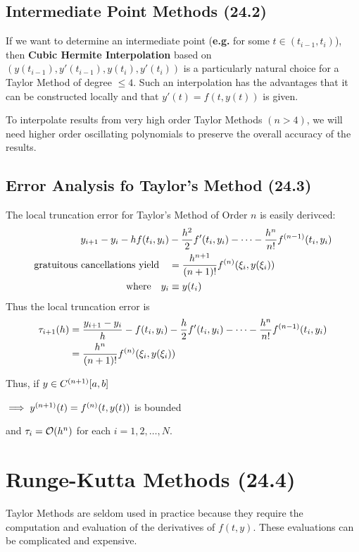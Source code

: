 \documentclass[12pt]{article}
\newcommand{\eg}{\textbf{e.g.}\xspace}
\begin{document}
\subsection{Intermediate Point Methods (24.2)}
If we want to determine an intermediate point (\eg for some
$t\in(t_{i-1},t_i)$), then \textbf{Cubic Hermite Interpolation} based on
$(y(t_{i-1}), y'(t_{i-1}), y(t_i), y'(t_i))$ is a particularly natural choice
for a Taylor Method of degree $\leq 4$. Such an interpolation has the advantages
that it can be constructed locally and that $y'(t) = f(t,y(t))$ is given.

To interpolate results from very high order Taylor Methods $(n>4)$, we will need
higher order oscillating polynomials to preserve the overall accuracy of the
results.

\subsection{Error Analysis fo Taylor's Method (24.3)}
The local truncation error for Taylor's Method of Order $n$ is easily derivced:
\begin{align*}
  y_{i+1} - y_i - h f\pqty{t_i, y_i} 
    &- \frac{h^2}{2} f'\pqty{t_i, y_i} 
    - \cdots 
    - \frac{h^n}{n!} f^{(n-1)}\pqty{t_i, y_i} \\
    \text{gratuitous cancellations yield}\quad &= \frac{h^{n+1}}{(n+1)!} f^{(n)}\pqty{\xi_i, y\pqty{\xi_i}} \\
  \text{where} \quad y_i &\equiv y\pqty{t_i}
\end{align*}
Thus the local truncation error is
\begin{align*}
  \tau_{i+1}(h) &= \frac{y_{i+1} - y_i}{h} - f\pqty{t_i, y_i} - \frac{h}{2} f'\pqty{t_i, y_i} - \cdots - \frac{h^n}{n!} f^{(n-1)}\pqty{t_i, y_i} \\
                &= \frac{h^n}{(n+1)!} f^{(n)}\pqty{\xi_i, y\pqty{\xi_i}} \\
\end{align*}
{
  Thus, if
  $y \in C^{(n+1)}\bqty{a, b}$

  \hangindent=0.5in
  $\implies y^{(n+1)}(t) = f^{(n)}\pqty{t, y(t)}$ is bounded

  and $\tau_i = \order{h^n}$ for each $i = 1, 2, \dots, N.$
}

\section{Runge-Kutta Methods (24.4)}
Taylor Methods are seldom used in practice because they require the computation
and evaluation of the derivatives of $f(t,y)$. These evaluations can be
complicated and expensive.
\end{document}
